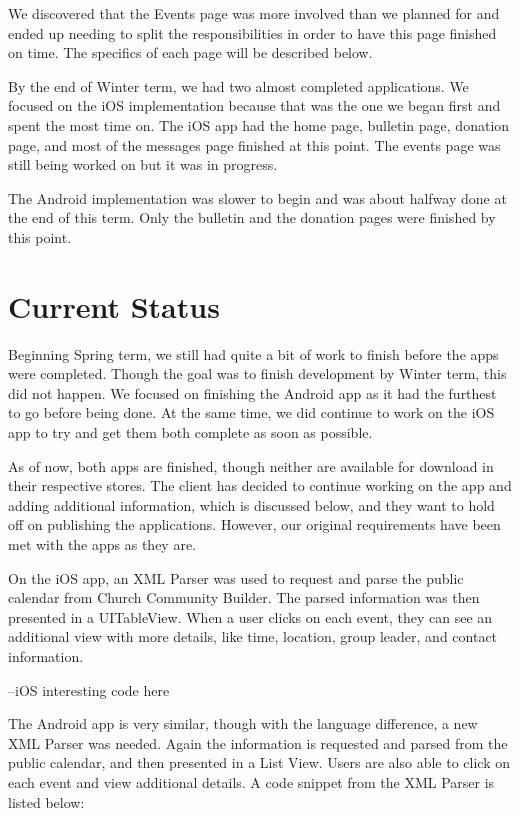 \documentclass[letterpaper,10pt,draftclsnofoot,onecolumn,titlepage]{IEEEtran}
\begin{document}
		We discovered that the Events page was more involved than we planned for and ended up needing to split the responsibilities in order to have this page finished on time. 
		The specifics of each page will be described below. 
		
				
		By the end of Winter term, we had two almost completed applications.
		We focused on the iOS implementation because that was the one we began first and spent the most time on. 
		The iOS app had the home page, bulletin page, donation page, and most of the messages page finished at this point. 
		The events page was still being worked on but it was in progress. 
		
		The Android implementation was slower to begin and was about halfway done at the end of this term. 
		Only the bulletin and the donation pages were finished by this point. 
		
		
		
\section{Current Status}
		Beginning Spring term, we still had quite a bit of work to finish before the apps were completed. 
		Though the goal was to finish development by Winter term, this did not happen. 
		We focused on finishing the Android app as it had the furthest to go before being done. 
		At the same time, we did continue to work on the iOS app to try and get them both complete as soon as possible. 
		
		As of now, both apps are finished, though neither are available for download in their respective stores.
		The client has decided to continue working on the app and adding additional information, which is discussed below, and they want to hold off on publishing the applications. 
		However, our original requirements have been met with the apps as they are. 

On the iOS app, an XML Parser was used to request and parse the public calendar from Church Community Builder.
		The parsed information was then presented in a UITableView. 
		When a user clicks on each event, they can see an additional view with more details, like time, location, group leader, and contact information.
		
		--iOS interesting code here
		
		The Android app is very similar, though with the language difference, a new XML Parser was needed. 
		Again the information is requested and parsed from the public calendar, and then presented in a List View. 
		Users are also able to click on each event and view additional details. 
		A code snippet from the XML Parser is listed below: 
		
\end{document}
